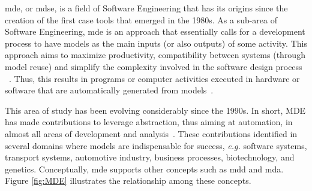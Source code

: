 \ac{mde}, or \ac{mdse}, is a field of Software Engineering that has its origins since the creation of the first \ac{case} tools that emerged in the 1980s.
As a sub-area of Software Engineering, \ac{mde} is an approach that essentially calls for a development process to have models as the main inputs (or also outputs) of some activity.
This approach aims to maximize productivity, compatibility between systems (through model reuse) and simplify the complexity involved in the software design process ~\cite{Brambilla:2017}.
Thus, this results in programs or computer activities executed in hardware or software that are automatically generated from models~\cite{Sommerville:2015}.

This area of study has been evolving considerably since the 1990s.
In short, MDE has made contributions to leverage abstraction, thus aiming at automation, in almost all areas of development and analysis~\cite{Bucchiarone:2020}.
These contributions identified in several domains where models are indispensable for success, \textit{e.g.} software systems, transport systems, automotive industry, business processes, biotechnology, and genetics.
Conceptually, \ac{mde} supports other concepts such as \ac{mdd} and \ac{mda}. 
Figure \ref{fig:MDE} illustrates the relationship among these concepts.

